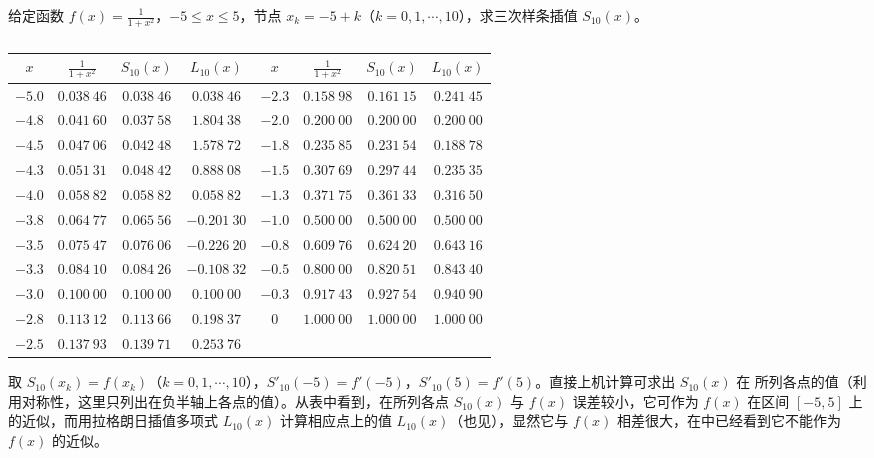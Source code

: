 \documentclass[../../main.tex]{subfiles}
\begin{document}
\begin{example}
给定函数 $f(x)=\frac{1}{1+x^2}$，$-5\leqslant x\leqslant 5$，节点 $x_k=-5+k$（$k=0,1,\cdots,10$），求三次样条插值 $S_{10}(x)$。
\end{example}
\begin{solution}
\begin{table}[H]
\centering
\caption{}
\label{table:数值分析例题表格2-7}
\begin{tabular}{c c c c || c c c c}
\hline
$x$ & $\frac{1}{1+x^2}$ & $S_{10}(x)$ & $L_{10}(x)$ & $x$ & $\frac{1}{1+x^2}$ & $S_{10}(x)$ & $L_{10}(x)$ \\
\hline
$-5.0$ & $0.038\ 46$ & $0.038\ 46$ & $0.038\ 46$ & $-2.3$ & $0.158\ 98$ & $0.161\ 15$ & $0.241\ 45$ \\
$-4.8$ & $0.041\ 60$ & $0.037\ 58$ & $1.804\ 38$ & $-2.0$ & $0.200\ 00$ & $0.200\ 00$ & $0.200\ 00$ \\
$-4.5$ & $0.047\ 06$ & $0.042\ 48$ & $1.578\ 72$ & $-1.8$ & $0.235\ 85$ & $0.231\ 54$ & $0.188\ 78$ \\
$-4.3$ & $0.051\ 31$ & $0.048\ 42$ & $0.888\ 08$ & $-1.5$ & $0.307\ 69$ & $0.297\ 44$ & $0.235\ 35$ \\
$-4.0$ & $0.058\ 82$ & $0.058\ 82$ & $0.058\ 82$ & $-1.3$ & $0.371\ 75$ & $0.361\ 33$ & $0.316\ 50$ \\
$-3.8$ & $0.064\ 77$ & $0.065\ 56$ & $-0.201\ 30$ & $-1.0$ & $0.500\ 00$ & $0.500\ 00$ & $0.500\ 00$ \\
$-3.5$ & $0.075\ 47$ & $0.076\ 06$ & $-0.226\ 20$ & $-0.8$ & $0.609\ 76$ & $0.624\ 20$ & $0.643\ 16$ \\
$-3.3$ & $0.084\ 10$ & $0.084\ 26$ & $-0.108\ 32$ & $-0.5$ & $0.800\ 00$ & $0.820\ 51$ & $0.843\ 40$ \\
$-3.0$ & $0.100\ 00$ & $0.100\ 00$ & $0.100\ 00$ & $-0.3$ & $0.917\ 43$ & $0.927\ 54$ & $0.940\ 90$ \\
$-2.8$ & $0.113\ 12$ & $0.113\ 66$ & $0.198\ 37$ & $0$ & $1.000\ 00$ & $1.000\ 00$ & $1.000\ 00$ \\
$-2.5$ & $0.137\ 93$ & $0.139\ 71$ & $0.253\ 76$ &  &  &  &  \\
\hline
\end{tabular}
\end{table}
取 $S_{10}(x_k)=f(x_k)$（$k=0,1,\cdots,10$），$S'_{10}(-5)=f'(-5)$，$S'_{10}(5)=f'(5)$。直接上机计算可求出 $S_{10}(x)$ 在 所列各点的值（利用对称性，这里只列出在负半轴上各点的值）。从表中看到，在所列各点 $S_{10}(x)$ 与 $f(x)$ 误差较小，它可作为 $f(x)$ 在区间 $[-5,5]$ 上的近似，而用拉格朗日插值多项式 $L_{10}(x)$ 计算相应点上的值 $L_{10}(x)$（也见），显然它与 $f(x)$ 相差很大，在中已经看到它不能作为 $f(x)$ 的近似。
\end{solution}
\end{document}

